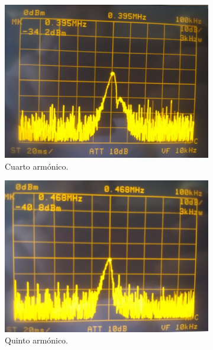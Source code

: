 \begin{figure}[H]
\begin{subfigure}{.4\textwidth}
\centering
	\includegraphics[width=\textwidth]{Imagenes-Ej1/4Armonico.jpeg}
	\caption{Cuarto armónico.}
	\label{fig:4to}
\end{subfigure}
\begin{subfigure}{.4\textwidth}
\centering
	\includegraphics[width=\textwidth]{Imagenes-Ej1/5Armonico.jpeg}
	\caption{Quinto armónico.}
	\label{fig:5to}
\end{subfigure}
\begin{subfigure}{.425\textwidth}
\centering

\end{subfigure}
\end{figure}
